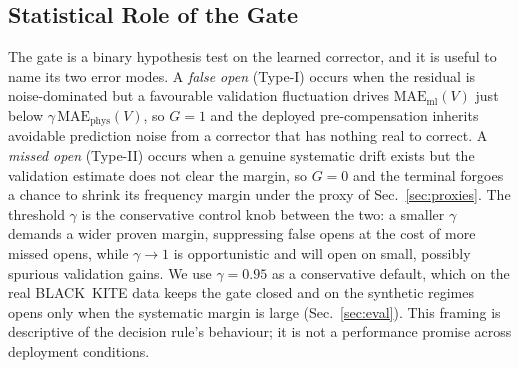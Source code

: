 \documentclass[conference]{IEEEtran}
\begin{document}
\subsection{Statistical Role of the Gate}
\label{sec:stat}
The gate is a binary hypothesis test on the learned corrector, and it is useful
to name its two error modes. A \emph{false open} (Type-I) occurs when the residual
is noise-dominated but a favourable validation fluctuation drives
$\mathrm{MAE}_{\mathrm{ml}}(V)$ just below $\gamma\,\mathrm{MAE}_{\mathrm{phys}}(V)$,
so $G=1$ and the deployed pre-compensation inherits avoidable prediction noise
from a corrector that has nothing real to correct. A \emph{missed open} (Type-II)
occurs when a genuine systematic drift exists but the validation estimate does not
clear the margin, so $G=0$ and the terminal forgoes a chance to shrink its
frequency margin under the proxy of Sec.~\ref{sec:proxies}. The threshold
$\gamma$ is the conservative control knob between the two: a smaller $\gamma$
demands a wider proven margin, suppressing false opens at the cost of more missed
opens, while $\gamma\!\to\!1$ is opportunistic and will open on small, possibly
spurious validation gains. We use $\gamma=0.95$ as a conservative default, which
on the real BLACK~KITE data keeps the gate closed and on the synthetic regimes
opens only when the systematic margin is large (Sec.~\ref{sec:eval}). This framing
is descriptive of the decision rule's behaviour; it is not a performance promise
across deployment conditions.
\end{document}
